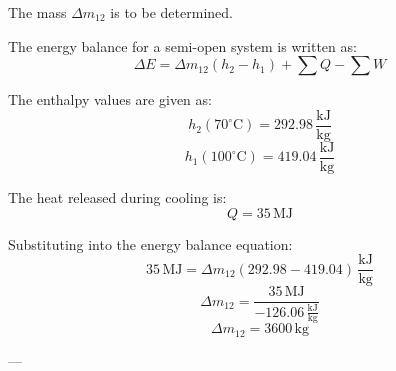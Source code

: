 The mass \( \Delta m_{12} \) is to be determined.  

The energy balance for a semi-open system is written as:  
\[
\Delta E = \Delta m_{12}(h_2 - h_1) + \sum Q - \sum W
\]  

The enthalpy values are given as:  
\[
h_2 (70^\circ\text{C}) = 292.98 \, \frac{\text{kJ}}{\text{kg}}
\]  
\[
h_1 (100^\circ\text{C}) = 419.04 \, \frac{\text{kJ}}{\text{kg}}
\]  

The heat released during cooling is:  
\[
Q = 35 \, \text{MJ}
\]  

Substituting into the energy balance equation:  
\[
35 \, \text{MJ} = \Delta m_{12} (292.98 - 419.04) \, \frac{\text{kJ}}{\text{kg}}
\]  
\[
\Delta m_{12} = \frac{35 \, \text{MJ}}{-126.06 \, \frac{\text{kJ}}{\text{kg}}}
\]  
\[
\Delta m_{12} = 3600 \, \text{kg}
\]  

---